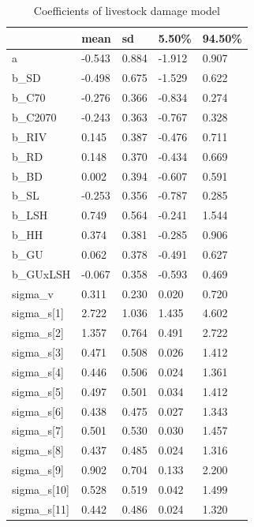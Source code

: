 \documentclass[12pt,]{article}
\begin{document}
\begin{table}[]
\centering
\footnotesize
\caption{Coefficients of livestock damage model}
\begin{tabular}{lllll}
                  & mean   & sd    & 5.50\% & 94.50\% \\ \hline
a                 & -0.543 & 0.884 & -1.912 & 0.907   \\
b\_SD             & -0.498 & 0.675 & -1.529 & 0.622   \\
b\_C70            & -0.276 & 0.366 & -0.834 & 0.274   \\
b\_C2070          & -0.243 & 0.363 & -0.767 & 0.328   \\
b\_RIV            & 0.145  & 0.387 & -0.476 & 0.711   \\
b\_RD             & 0.148  & 0.370 & -0.434 & 0.669   \\
b\_BD             & 0.002  & 0.394 & -0.607 & 0.591   \\
b\_SL             & -0.253 & 0.356 & -0.787 & 0.285   \\
b\_LSH            & 0.749  & 0.564 & -0.241 & 1.544   \\
b\_HH             & 0.374  & 0.381 & -0.285 & 0.906   \\
b\_GU             & 0.062  & 0.378 & -0.491 & 0.627   \\
b\_GUxLSH         & -0.067 & 0.358 & -0.593 & 0.469   \\
sigma\_v          & 0.311  & 0.230 & 0.020  & 0.720   \\
sigma\_s{[}1{]}   & 2.722  & 1.036 & 1.435  & 4.602   \\
sigma\_s{[}2{]}   & 1.357  & 0.764 & 0.491  & 2.722   \\
sigma\_s{[}3{]}   & 0.471  & 0.508 & 0.026  & 1.412   \\
sigma\_s{[}4{]}   & 0.446  & 0.506 & 0.024  & 1.361   \\
sigma\_s{[}5{]}   & 0.497  & 0.501 & 0.034  & 1.412   \\
sigma\_s{[}6{]}   & 0.438  & 0.475 & 0.027  & 1.343   \\
sigma\_s{[}7{]}   & 0.501  & 0.530 & 0.030  & 1.457   \\
sigma\_s{[}8{]}   & 0.437  & 0.485 & 0.024  & 1.316   \\
sigma\_s{[}9{]}   & 0.902  & 0.704 & 0.133  & 2.200   \\
sigma\_s{[}10{]}  & 0.528  & 0.519 & 0.042  & 1.499   \\
sigma\_s{[}11{]}  & 0.442  & 0.486 & 0.024  & 1.320   \\

\end{tabular}
\end{table}
\end{document}
